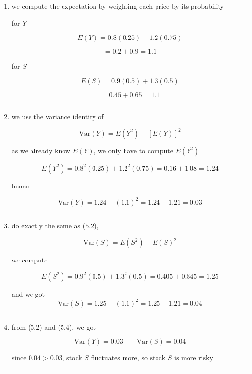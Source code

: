 \begin{enumerate}

\item we compute the expectation by weighting each price by its probability

for $Y$

\[
E(Y)=0.8(0.25)+1.2(0.75)
\]

\[
=0.2+0.9=\boxed{1.1}
\]

for $S$

\[
E(S)=0.9(0.5)+1.3(0.5)
\]

\[
=0.45+0.65=\boxed{1.1}
\]

\medskip
\begin{center}
\rule{0.3\linewidth}{0.2pt}
\end{center}
\medskip

\item we use the variance identity of

\[
\mathrm{Var}(Y)=E(Y^2)-[E(Y)]^2
\]

as we already know $E(Y)$, we only have to compute $E(Y^2)$

\[
E(Y^2)=0.8^2(0.25)+1.2^2(0.75) =0.16+1.08=1.24
\]

hence

\[
\mathrm{Var}(Y)=1.24-(1.1)^2=1.24-1.21=\boxed{0.03}
\]

\medskip
\begin{center}
\rule{0.3\linewidth}{0.2pt}
\end{center}
\medskip

\item do exactly the same as (5.2), 

\[
\mathrm{Var}(S)=E(S^2)-E(S)^2
\]

we compute 

\[
E(S^2)=0.9^2(0.5)+1.3^2(0.5)=0.405+0.845=1.25
\]

and we got 
\[
\mathrm{Var}(S)=1.25-(1.1)^2=1.25-1.21=\boxed{0.04}
\]

\medskip
\begin{center}
\rule{0.3\linewidth}{0.2pt}
\end{center}
\medskip

\item from (5.2) and (5.4), we got

\[
\mathrm{Var}(Y)=0.03
\qquad
\mathrm{Var}(S)=0.04
\]

since $0.04>0.03$, stock $S$ fluctuates more, so $\boxed{\text{stock }S\text{ is more risky}}$

\medskip
\begin{center}
\rule{0.3\linewidth}{0.2pt}
\end{center}
\medskip


\end{enumerate}
